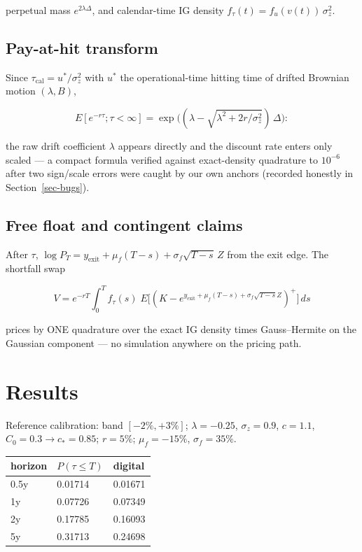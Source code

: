\documentclass[
  english,
  10pt,
  letterpaper,
  DIV=11,
  numbers=noendperiod]{scrartcl}
\newcounter{none} %
\begin{document}
perpetual mass \(e^{2\lambda\Delta}\), and calendar-time IG density
\(f_\tau(t)=f_u(v(t))\,\sigma_z^2\).

\subsection{Pay-at-hit transform}\label{pay-at-hit-transform}

Since \(\tau_{\text{cal}}=u^*/\sigma_z^2\) with \(u^*\) the
operational-time hitting time of drifted Brownian motion
\((\lambda,B)\),

\[
E[e^{-r\tau};\tau<\infty]
=\exp\Big((\lambda-\sqrt{\lambda^2+2r/\sigma_z^2})\,\Delta\Big):
\]

the raw drift coefficient \(\lambda\) appears directly and the discount
rate enters only scaled --- a compact formula verified against
exact-density quadrature to \(10^{-6}\) after two sign/scale errors were
caught by our own anchors (recorded honestly in Section~\ref{sec-bugs}).

\subsection{Free float and contingent
claims}\label{free-float-and-contingent-claims}

After \(\tau\),
\(\log P_T=y_{\text{exit}}+\mu_f(T-s)+\sigma_f\sqrt{T-s}\,Z\) from the
exit edge. The shortfall swap

\[
V=e^{-rT}\int_0^T f_\tau(s)\;
E\big[(K-e^{y_{\text{exit}}+\mu_f(T-s)+\sigma_f\sqrt{T-s}Z})^+\big]\,ds
\]

prices by ONE quadrature over the exact IG density times Gauss--Hermite
on the Gaussian component --- no simulation anywhere on the pricing
path.

\section{Results}\label{sec-results}

Reference calibration: band \([-2\%,+3\%]\); \(\lambda=-0.25\),
\(\sigma_z=0.9\), \(c=1.1\), \(C_0=0.3\to c_*=0.85\); \(r=5\%\);
\(\mu_f=-15\%\), \(\sigma_f=35\%\).

{\def\LTcaptype{none} %
\begin{longtable}[]{@{}lll@{}}
\toprule\noalign{}
horizon & \(P(\tau\le T)\) & digital \\
\midrule\noalign{}
\endhead
\bottomrule\noalign{}
\endlastfoot
0.5y & 0.01714 & 0.01671 \\
1y & 0.07726 & 0.07349 \\
2y & 0.17785 & 0.16093 \\
5y & 0.31713 & 0.24698 \\
\end{longtable}
}
\end{document}
